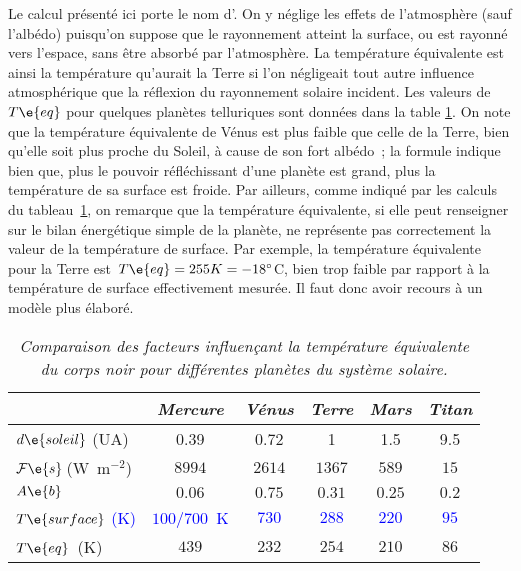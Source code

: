 Le calcul présenté ici porte le nom d'. On y néglige les effets de l'atmosphère (sauf l'albédo) puisqu'on suppose que le rayonnement atteint la surface, ou est rayonné vers l'espace, sans être absorbé par l'atmosphère. La température équivalente est ainsi la température qu'aurait la Terre si l'on négligeait tout autre influence atmosphérique que la réflexion du rayonnement solaire incident. Les valeurs de $T\e{eq}$ pour quelques planètes telluriques sont données dans la table \ref{tab:planets}. On note que la température équivalente de Vénus est plus faible que celle de la Terre, bien qu'elle soit plus proche du Soleil, à cause de son fort albédo~; la formule indique bien que, plus le pouvoir réfléchissant d'une planète est grand, plus la température de sa surface est froide. Par ailleurs, comme indiqué par les calculs du tableau~\ref{tab:planets}, on remarque que la température équivalente, si elle peut renseigner sur le bilan énergétique simple de la planète, ne représente pas correctement la valeur de la température de surface. Par exemple, la température équivalente pour la Terre est~$T\e{eq} = 255 K = -18^{\circ}$C, bien trop faible par rapport à la température de surface effectivement mesurée. Il faut donc avoir recours à un modèle plus élaboré.

\begin{table}\label{tab:planets} \begin{center} \begin{tabular}{lccccc} & \emph{Mercure} & \emph{V\'enus} & \emph{Terre} & \emph{Mars} & \emph{ Titan} \\ \hline $d\e{soleil}$ (UA) & 0.39 & 0.72 & 1 & 1.5 & 9.5 \\ $\mathcal{F}\e{s}\,$(W~m$^{-2}$) & $8994$ & $2614$ & $1367$ & $589$ & $15$ \\ $A\e{b}$ & $0.06$ & $0.75$ & $0.31$ & $0.25$ & $0.2$ \\ \textcolor{blue}{$T\e{surface}$ (K)} & \textcolor{blue}{$100/700$~K} & \textcolor{blue}{$730$} & \textcolor{blue}{$288$} & \textcolor{blue}{$220$} & \textcolor{blue}{$95$} \\ \hline $T\e{eq}$~(K) & $439$ & $232$ & $254$ & $210$ & $86$\\ \end{tabular} \caption{\emph{Comparaison des facteurs influençant la température équivalente du corps noir pour différentes planètes du système solaire.}} \end{center} \end{table}
